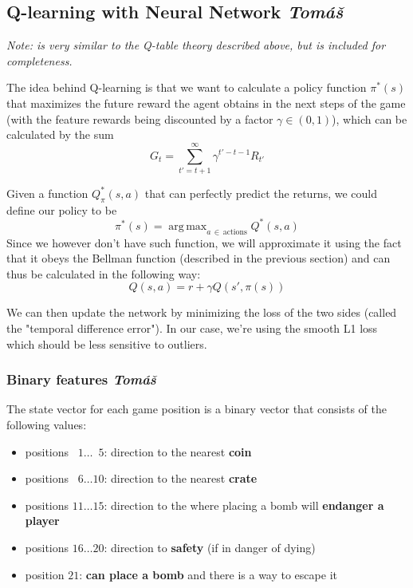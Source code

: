 \documentclass{article}
\DeclareMathOperator*{\argmax}{arg\,max}
\begin{document}
\clearpage
\subsection[Q-learning with Neural Network]{Q-learning with Neural Network {\normalsize \normalfont \it \hfill Tomáš}}

\textit{Note: is very similar to the Q-table theory described above, but is included for completeness.}

The idea behind Q-learning is that we want to calculate a policy function $\pi^*(s)$ that maximizes the future reward the agent obtains in the next steps of the game (with the feature rewards being discounted by a factor $\gamma \in (0, 1)$), which can be calculated by the sum $$G_t = \sum_{t' = t + 1}^{\infty} \gamma^{t' - t - 1} R_{t'}$$

Given a function $Q^*_\pi(s, a)$ that can perfectly predict the returns, we could define our policy to be $$\pi^*(s) = \argmax_{a\,\in\,\text{actions}} Q^*(s, a)$$
Since we however don't have such function, we will approximate it using the fact that it obeys the Bellman function (described in the previous section) and can thus be calculated in the following way: $$Q(s, a) = r + \gamma Q(s', \pi(s))$$

We can then update the network by minimizing the loss of the two sides (called the "temporal difference error").
In our case, we're using the smooth L1 loss which should be less sensitive to outliers.

\subsubsection[Binary features]{Binary features {\normalsize \normalfont \it \hfill Tomáš}}

The state vector for each game position is a binary vector that consists of the following values:

\begin{itemize}
    \item positions $\phantom{0}1 \ldots \phantom{0}5$: direction to the nearest \textbf{coin}
    \item positions $\phantom{0}6 \ldots 10$: direction to the nearest \textbf{crate}
    \item positions $11 \ldots 15$: direction to the where placing a bomb will \textbf{endanger a player}
    \item positions $16 \ldots 20$: direction to \textbf{safety} (if in danger of dying)
    \item position\phantom{s} $21$: \textbf{can place a bomb} and there is a way to escape it
\end{itemize}
\end{document}
